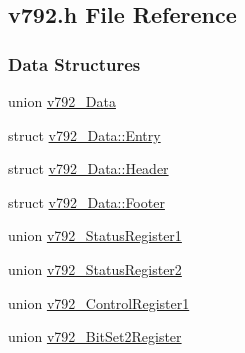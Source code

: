 \subsection{v792.h File Reference}
\label{v792_8h}
\subsubsection*{Data Structures}
\begin{DoxyCompactItemize}
\item 
union \hyperlink{unionv792__Data}{v792\_\-Data}
\item 
struct \hyperlink{structv792__Data_1_1Entry}{v792\_\-Data::Entry}
\item 
struct \hyperlink{structv792__Data_1_1Header}{v792\_\-Data::Header}
\item 
struct \hyperlink{structv792__Data_1_1Footer}{v792\_\-Data::Footer}
\item 
union \hyperlink{unionv792__StatusRegister1}{v792\_\-StatusRegister1}
\item 
union \hyperlink{unionv792__StatusRegister2}{v792\_\-StatusRegister2}
\item 
union \hyperlink{unionv792__ControlRegister1}{v792\_\-ControlRegister1}
\item 
union \hyperlink{unionv792__BitSet2Register}{v792\_\-BitSet2Register}
\end{DoxyCompactItemize}
